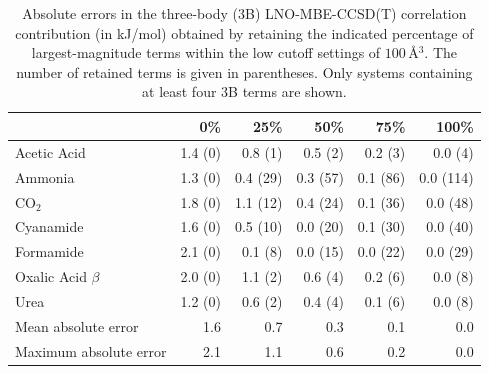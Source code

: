 \begin{table}[h]
\centering

\caption{\label{tab:x23_3b_energy_screening}Absolute errors in the three-body (3B) LNO-MBE-CCSD(T) correlation contribution (in kJ/mol) obtained by retaining the indicated percentage of largest-magnitude terms within the low cutoff settings of $100\,$\AA{}$^3$. The number of retained terms is given in parentheses. Only systems containing at least four 3B terms are shown.}
\begin{tabular}{lrrrrr}
\toprule
 & 0\% & 25\% & 50\% & 75\% & 100\% \\ 
\midrule
Acetic Acid & 1.4 (0) & 0.8 (1) & 0.5 (2) & 0.2 (3) & 0.0 (4) \\
Ammonia & 1.3 (0) & 0.4 (29) & 0.3 (57) & 0.1 (86) & 0.0 (114) \\
CO$_2$ & 1.8 (0) & 1.1 (12) & 0.4 (24) & 0.1 (36) & 0.0 (48) \\
Cyanamide & 1.6 (0) & 0.5 (10) & 0.0 (20) & 0.1 (30) & 0.0 (40) \\
Formamide & 2.1 (0) & 0.1 (8) & 0.0 (15) & 0.0 (22) & 0.0 (29) \\
Oxalic Acid $\beta$ & 2.0 (0) & 1.1 (2) & 0.6 (4) & 0.2 (6) & 0.0 (8) \\
Urea & 1.2 (0) & 0.6 (2) & 0.4 (4) & 0.1 (6) & 0.0 (8) \\
Mean absolute error & 1.6 & 0.7 & 0.3 & 0.1 & 0.0 \\
Maximum absolute error & 2.1 & 1.1 & 0.6 & 0.2 & 0.0 \\
\bottomrule
\end{tabular}

\end{table}